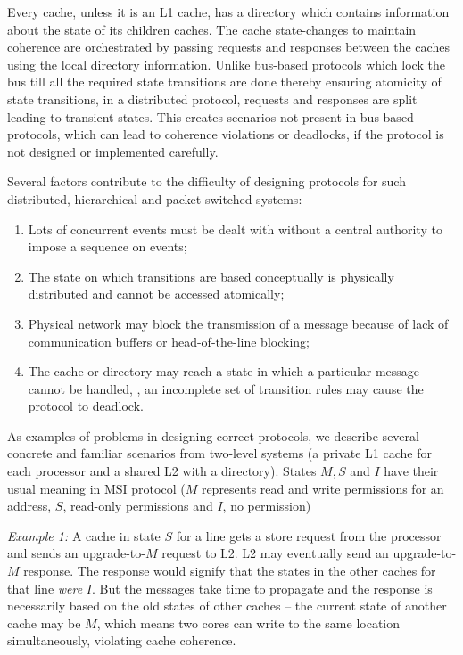 Every cache, unless it is an L1 cache, has a directory which contains
information about the state of its children caches. The cache state-changes to
maintain coherence are orchestrated by passing requests and responses between
the caches using the local directory information.  Unlike bus-based protocols
which lock the bus till all the required state transitions are done thereby
ensuring atomicity of state transitions, in a distributed protocol,
requests and responses are split leading to transient states. This creates
scenarios not present in bus-based protocols, which can lead to coherence
violations or deadlocks, if the protocol is not designed or implemented
carefully.

Several factors contribute to the difficulty of designing protocols for such
distributed, hierarchical and packet-switched systems:

\begin{enumerate}
\item Lots of concurrent events must be dealt with without a central authority
to impose a sequence on events;
\item The state on which transitions are based conceptually is physically
distributed and cannot be accessed atomically;
\item Physical network may block the transmission of a message because of lack
of communication buffers or head-of-the-line blocking;
\item The cache or directory may reach a state in which a particular message
cannot be handled, \ie, an incomplete set of transition rules may cause the protocol
to deadlock.
\end{enumerate}

As examples of problems in designing correct protocols, we describe several
concrete and familiar scenarios from two-level systems (a private L1 cache for
each processor and a shared L2 with a directory). States $M, S$ and $I$ have their
usual meaning in MSI protocol ($M$ represents read and write permissions for an
address, $S$, read-only permissions and $I$, no permission)

\noindent \emph{Example 1:} A cache in state $S$ for a line gets a store
request from the processor and sends an upgrade-to-$M$ request to L2.  L2 may
eventually send an upgrade-to-$M$ response. The response would signify that the
states in the other caches for that line \emph{were} $I$. But the messages take
time to propagate and the response is necessarily based on the old states of
other caches -- the current state of another cache may be $M$, which means two
cores can write to the same location simultaneously, violating cache coherence.

